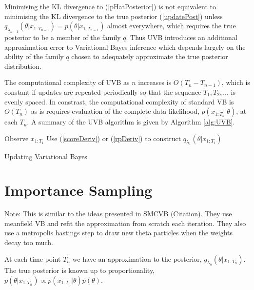 \documentclass[12pt,a4paper]{article}\usepackage[]{graphicx}\usepackage[]{color}
\begin{document}
Minimising the KL divergence to (\ref{pHatPosterior}) is not equivalent to minimising the KL divergence to the true posterior (\ref{updatePost}) unless $q_{\lambda_{n-1}}(\theta |  x_{1:T_{n-1}}) = p(\theta |  x_{1:T_{n-1}})$ almost everywhere, which requires the true posterior to be a member of the family $q$. Thus UVB introduces an additional approximation error to Variational Bayes inference which depends largely on the ability of the family $q$ chosen to adequately approximate the true posterior distribution.

The computational complexity of UVB as $n$ increases is $O(T_{n} - T_{n-1})$, which is constant if updates are repeated periodically so that the sequence $T_1, T_2, \dots$ is evenly spaced. In constrast, the computational complexity of standard VB is $O(T_{n})$ as is requires evaluation of the complete data likelihood, $p(x_{1:T_{n}} | \theta)$, at each $T_{n}$. A summary of the UVB algorithm is given by Algorithm \ref{alg:UVB}.

\begin{algorithm}[H]
 Observe $x_{1:T_1}$\;
 Use (\ref{scoreDeriv}) or (\ref{rpDeriv}) to construct $q_{\lambda_1}(\theta | x_{1:T_1})$\;
 \caption{Updating Variational Bayes}
  \label{alg:UVB}
\end{algorithm}

\section{Importance Sampling} \label{sec:IS}

Note: This is similar to the ideas presented in SMCVB (Citation). They use meanfield VB and refit the approximation from scratch each iteration. They also use a metropolis hastings step to draw new theta particles when the weights decay too much.

At each time point $T_n$ we have an approximation to the posterior, $q_{\lambda_n}(\theta | x_{1:T_n})$. The true posterior is known up to proportionality, $p(\theta | x_{1:T_n}) \propto p(x_{1:T_n} | \theta)p(\theta)$. 
\\
\end{document}
